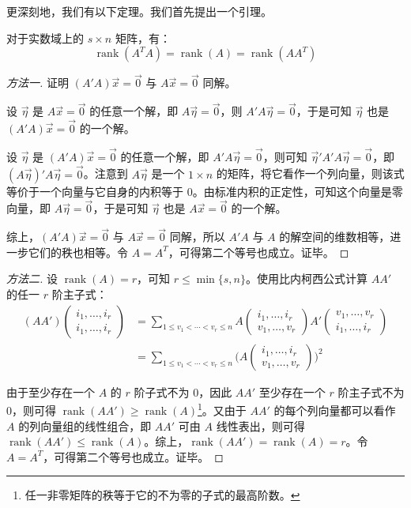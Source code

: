 更深刻地，我们有以下定理。我们首先提出一个引理。

\begin{theorem}
	对于实数域上的 $s \times n$ 矩阵，有：
	$$
	\operatorname{rank}(A^T A) = \operatorname{rank}(A) = \operatorname{rank}(AA^T)
	$$
\end{theorem}

\begin{proof}[方法一]
	证明 $(A'A) \vec x = \vec 0$ 与 $A \vec x = \vec 0$ 同解。

	设 $\vec \eta$ 是 $A \vec x = \vec 0$ 的任意一个解，即 $A \vec \eta = \vec 0$，则 $A'A \vec \eta = \vec 0$，于是可知 $\vec \eta$ 也是 $(A'A) \vec x = \vec 0$ 的一个解。

	设 $\vec \eta$ 是 $(A'A) \vec x = \vec 0$ 的任意一个解，即 $A' A \vec \eta = \vec 0$，则可知 $\vec \eta' A' A \vec \eta = \vec 0$，即 $(A \vec \eta)' A \vec \eta = \vec 0$。注意到 $A \vec \eta$ 是一个 $1 \times n$ 的矩阵，将它看作一个列向量，则该式等价于一个向量与它自身的内积等于 $0$。由标准内积的正定性，可知这个向量是零向量，即 $A \vec \eta = \vec 0$，于是可知 $\vec \eta$ 也是 $A \vec x = \vec 0$ 的一个解。

	综上，$(A'A)\vec x = \vec 0$ 与 $A \vec x = \vec 0$ 同解，所以 $A'A$ 与 $A$ 的解空间的维数相等，进一步它们的秩也相等。令 $A = A^T$，可得第二个等号也成立。证毕。
\end{proof}

\begin{proof}[方法二]
	设 $\operatorname{rank}(A) = r$，可知 $r \le \min \{s, n\}$。使用比内柯西公式计算 $AA'$ 的任一 $r$ 阶主子式：
	$$
	\begin{aligned}
		(AA') \begin{pmatrix} i_1, \ldots, i_r \\ i_1, \ldots, i_r \end{pmatrix} &= \sum\limits_{1 \le v_1 < \cdots < v_r \le n} A \begin{pmatrix} i_1, \ldots, i_r \\ v_1, \ldots, v_r \end{pmatrix} A' \begin{pmatrix} v_1, \ldots, v_r \\ i_1, \ldots, i_r \end{pmatrix}
		\\&=
		\sum\limits_{1 \le v_1 < \cdots < v_r \le n} \Biggl( A \begin{pmatrix} i_1, \ldots, i_r \\ v_1, \ldots, v_r \end{pmatrix} \Biggr)^2
	\end{aligned}
	$$

	由于至少存在一个 $A$ 的 $r$ 阶子式不为 $0$，因此 $AA'$ 至少存在一个 $r$ 阶主子式不为 $0$，则可得 $\operatorname{rank}(AA') \ge \operatorname{rank}(A)$\footnote{任一非零矩阵的秩等于它的不为零的子式的最高阶数。}。又由于 $AA'$ 的每个列向量都可以看作 $A$ 的列向量组的线性组合，即 $AA'$ 可由 $A$ 线性表出，则可得 $\operatorname{rank}(AA') \le \operatorname{rank}(A)$。综上，$\operatorname{rank}(AA') = \operatorname{rank}(A) = r$。令 $A = A^T$，可得第二个等号也成立。证毕。
\end{proof}

